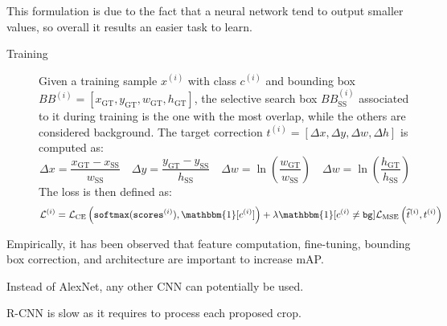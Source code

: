 \begin{description}
\begin{description}
                \begin{remark}
                    This formulation is due to the fact that a neural network tend to output smaller values, so overall it results an easier task to learn.
                \end{remark}

                \begin{description}
                    \item[Training] 
                    Given a training sample $x^{(i)}$ with class $c^{(i)}$ and bounding box $BB^{(i)} = [x_\text{GT}, y_\text{GT}, w_\text{GT}, h_\text{GT}]$, the selective search box $BB_\text{SS}^{(i)}$ associated to it during training is the one with the most overlap, while the others are considered background. The target correction $t^{(i)} = [\Delta x, \Delta y, \Delta w, \Delta h]$ is computed as:
                    \[ 
                        \Delta x = \frac{x_\text{GT} - x_\text{SS}}{w_\text{SS}}
                        \quad
                        \Delta y = \frac{y_\text{GT} - y_\text{SS}}{h_\text{SS}}
                        \quad
                        \Delta w = \ln\left(\frac{w_\text{GT}}{w_\text{SS}} \right)
                        \quad
                        \Delta w = \ln\left( \frac{h_\text{GT}}{h_\text{SS}} \right)
                    \]
                    The loss is then defined as:
                    \[ \mathcal{L}^{(i)} = \mathcal{L}_\text{CE}\left( \texttt{softmax}(\texttt{scores}^{(i)}), \mathbbm{1}[c^{(i)}] \right) + \lambda \mathbbm{1}[c^{(i)} \neq \texttt{bg}] \mathcal{L}_\text{MSE}\left(\widehat{t}^{(i)}, t^{(i)} \right) \]

                \end{description}
        \end{description}

        \begin{remark}
            Empirically, it has been observed that feature computation, fine-tuning, bounding box correction, and architecture are important to increase mAP.
        \end{remark}

        \begin{remark}
            Instead of AlexNet, any other CNN can potentially be used.
        \end{remark}

        \begin{remark}
            R-CNN is slow as it requires to process each proposed crop.
        \end{remark}


\end{description}
